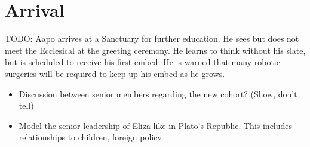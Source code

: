 %
%

\chapter{Arrival}

TODO: Aapo arrives at a Sanctuary for further education. He sees but does not meet the Ecclesical at the greeting ceremony. He learns to think without his slate, but is scheduled to receive his first embed. He is warned that many robotic surgeries will be required to keep up his embed as he grows.

\begin{itemize}
\item Discussion between senior members regarding the new cohort? (Show, don't tell)
\item Model the senior leadership of Eliza like in Plato's Republic. This includes relationships to children, foreign policy.
\end{itemize}


\newpage
\thispagestyle{empty}
